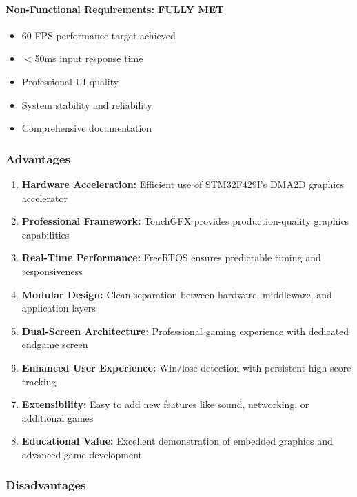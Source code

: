 \documentclass[12pt,a4paper]{article}
\begin{document}
\paragraph{Non-Functional Requirements: \textcolor{green}{\checkmark} FULLY MET}
\begin{itemize}[leftmargin=*]
    \item[\textcolor{green}{\checkmark}] 60 FPS performance target achieved
    \item[\textcolor{green}{\checkmark}] $<$50ms input response time
    \item[\textcolor{green}{\checkmark}] Professional UI quality
    \item[\textcolor{green}{\checkmark}] System stability and reliability
    \item[\textcolor{green}{\checkmark}] Comprehensive documentation
\end{itemize}

\subsubsection{Advantages}

\begin{enumerate}[leftmargin=*]
    \item \textbf{Hardware Acceleration:} Efficient use of STM32F429I's DMA2D graphics accelerator
    \item \textbf{Professional Framework:} TouchGFX provides production-quality graphics capabilities
    \item \textbf{Real-Time Performance:} FreeRTOS ensures predictable timing and responsiveness
    \item \textbf{Modular Design:} Clean separation between hardware, middleware, and application layers
    \item \textbf{Dual-Screen Architecture:} Professional gaming experience with dedicated endgame screen
    \item \textbf{Enhanced User Experience:} Win/lose detection with persistent high score tracking
    \item \textbf{Extensibility:} Easy to add new features like sound, networking, or additional games
    \item \textbf{Educational Value:} Excellent demonstration of embedded graphics and advanced game development
\end{enumerate}

\subsubsection{Disadvantages}
\end{document}
